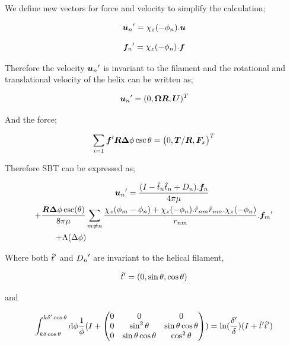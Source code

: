 \documentclass[12pt,a4paper,titlepage]{report}
\begin{document}
We define new vectors for force and velocity to simplify the calculation;



\begin{equation}
{\bm{u}_n}\rq{}= \chi_z(-\phi_n). \bm{u}
\label{NewVelo}
\end{equation}

\begin{equation}
{\bm{f}_n}\rq{}= \chi_z(-\phi_n). \bm{f}
\label{NewForce}
\end{equation}

Therefore the velocity ${\bm{u}_n}\rq{}$ is invariant to the filament and the rotational and translational velocity 
of the helix can be written as;

\begin{equation}
{\bm{u}_n}\rq{}= (0, \bm{\Omega} \bm{R} , \bm{U})^T
\label{NewVelo1}
\end{equation}

And the force;


\begin{equation}
\sum_{i=1} {\bm{f}}\rq{} \bm{R} \bm{\Delta}\phi \csc \theta = {\big(0, \bm{T}/\bm{R}, \bm{F}_x \big)}^T
\label{Newforce1}
\end{equation}

Therefore \ac*{SBT} can be expressed as;

\begin{multline}
\qquad {\bm{u}_n}\rq{}= \frac{(I- \hat{t}_n\hat{t}_n + D_n). \bm{f}_n}{4\pi \mu}\\
+ \frac{\bm{R}\bm{\Delta}\phi \csc (\theta)}{8 \pi \mu} \sum_{m \neq n}  \frac{ \chi_z(\phi_m - \phi_n)+ \chi_z(-\phi_n).\hat{r}_{nm}\hat{r}_{nm}. \chi_z(-\phi_n)}{r_{nm}}. {\bm{f}_m}\rq{}\\
+ \Lambda (\Delta \phi) \qquad \qquad \qquad \qquad \qquad \qquad \qquad \qquad \qquad \qquad
\label{NewVelo2}
\end{multline} 



Where both ${\hat{t}}\rq{}$ and ${D_n}\rq{}$ are invariant to the helical filament,


\begin{equation}
{\hat{t}}\rq{}= (0, \sin \theta, \cos \theta)
\label{invariant}
\end{equation}


and 


\begin{equation}
\int_{k \delta \cos \theta}^{k {\delta}\rq{} \cos \theta} \mathrm  d\phi \frac{1}{\phi}(I +\begin{pmatrix}
  0 & 0 & 0 \\
  0 & \sin^2\theta  & \sin\theta\cos\theta \\
  0 & \sin\theta\cos\theta & \cos^2\theta
 \end{pmatrix})=\ln(\frac{\delta\rq{}}{\delta})(I + {\hat{t}}\rq{} {\hat{t}}\rq{})
\label{FinalD}
\end{equation}
\end{document}

